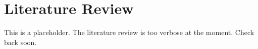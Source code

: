 \chapter{Literature Review}
This is a placeholder. 
The literature review is too verbose at the moment. 
Check back soon.
